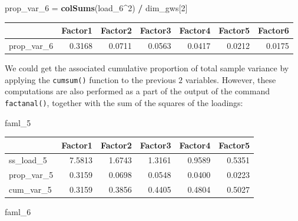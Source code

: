 \documentclass[
]{article}
\newenvironment{Shaded}{\begin{snugshade}}{\end{snugshade}}
\newcommand{\DecValTok}[1]{\textcolor[rgb]{0.00,0.00,0.81}{#1}}
\newcommand{\FunctionTok}[1]{\textcolor[rgb]{0.13,0.29,0.53}{\textbf{#1}}}
\newcommand{\NormalTok}[1]{#1}
\newcommand{\OtherTok}[1]{\textcolor[rgb]{0.56,0.35,0.01}{#1}}
\newcommand{\SpecialCharTok}[1]{\textcolor[rgb]{0.81,0.36,0.00}{\textbf{#1}}}
\theoremstyle{plain}
\begin{document}
\begin{Shaded}
\begin{Highlighting}[]
\NormalTok{prop\_var\_6 }\OtherTok{=} \FunctionTok{colSums}\NormalTok{(load\_6}\SpecialCharTok{\^{}}\DecValTok{2}\NormalTok{) }\SpecialCharTok{/}\NormalTok{ dim\_gws[}\DecValTok{2}\NormalTok{]}
\end{Highlighting}
\end{Shaded}

\begin{longtable}[]{@{}lrrrrrr@{}}
\toprule\noalign{}
& Factor1 & Factor2 & Factor3 & Factor4 & Factor5 & Factor6 \\
\midrule\noalign{}
\endhead
\bottomrule\noalign{}
\endlastfoot
prop\_var\_6 & 0.3168 & 0.0711 & 0.0563 & 0.0417 & 0.0212 & 0.0175 \\
\end{longtable}

We could get the associated cumulative proportion of total sample
variance by applying the \texttt{cumsum()} function to the previous
\(2\) variables. However, these computations are also performed as a
part of the output of the command \texttt{factanal()}, together with the
sum of the squares of the loadings:

\smallskip

\begin{Shaded}
\begin{Highlighting}[]
\NormalTok{faml\_5}
\end{Highlighting}
\end{Shaded}

\begin{longtable}[]{@{}lrrrrr@{}}
\toprule\noalign{}
& Factor1 & Factor2 & Factor3 & Factor4 & Factor5 \\
\midrule\noalign{}
\endhead
\bottomrule\noalign{}
\endlastfoot
ss\_load\_5 & 7.5813 & 1.6743 & 1.3161 & 0.9589 & 0.5351 \\
prop\_var\_5 & 0.3159 & 0.0698 & 0.0548 & 0.0400 & 0.0223 \\
cum\_var\_5 & 0.3159 & 0.3856 & 0.4405 & 0.4804 & 0.5027 \\
\end{longtable}

\smallskip

\begin{Shaded}
\begin{Highlighting}[]
\NormalTok{faml\_6}
\end{Highlighting}
\end{Shaded}
\end{document}

